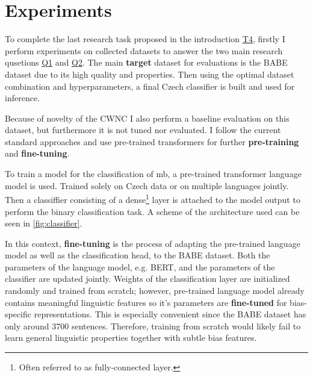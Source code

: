 \chapter{Experiments}\label{experiments}
To complete the last research task proposed in the introduction \hyperref[problem_definition]{T4}, firstly I perform experiments on collected datasets to answer the two main research qusetions \hyperref[Q1]{Q1} and \hyperref[Q2]{Q2}. The main \textbf{target} dataset for evaluations is the BABE dataset due to its high quality and properties. Then using the optimal dataset combination and hyperparameters, a final Czech classifier is built and used for inference.

Because of novelty of the CWNC I also perform a baseline evaluation on this dataset, but furthermore it is not tuned nor evaluated.
I follow the current standard approaches and use pre-trained transformers for further \textbf{pre-training} and \textbf{fine-tuning}.

To train a model for the classification of \gls{mb}, a pre-trained transformer language model is used. Trained solely on Czech data or on multiple languages jointly. Then a classiffier consisting of a dense\footnote{Often referred to as fully-connected layer.} layer is attached to the model output to perform the binary classification task. A scheme of the architecture used can be seen in \ref{fig:classifier}.

\begin{figure}
\end{figure}

In this context, \textbf{fine-tuning} is the process of adapting the pre-trained language model as well as the classification head, to the BABE dataset. Both the parameters of the language model, e.g. BERT, and the parameters of the classifier are updated jointly. Weights of the classification layer are initialized randomly and trained from scratch; however, pre-trained language model already contains meaningful linguistic features so it's parameters are \textbf{fine-tuned} for bias-specific representations. This is especially convenient since the BABE dataset has only around 3700 sentences. Therefore, training from scratch would likely fail to learn general linguistic properties together with subtle bias features.

